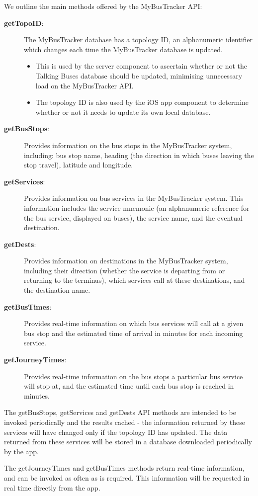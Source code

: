 \documentclass[10pt,twocolumn]{article}
\begin{document}
We outline the main methods offered by the MyBusTracker API:
\begin{description}
\item[\textbf{getTopoID}:] The MyBusTracker database has a topology ID, an alphanumeric identifier which changes each time the MyBusTracker database is updated.
\begin{itemize}
\item  This is used by the server component to ascertain whether or not the Talking Buses database should be updated, minimising unnecessary load on the MyBusTracker API.
\item The topology ID is also used by the iOS app component to determine whether or not it needs to update its own local database.
\end{itemize}
\item[\textbf{getBusStops}:] Provides information on the bus stops in the MyBusTracker system, including: bus stop name, heading (the direction in which buses leaving the stop travel), latitude and longitude.
\item[\textbf{getServices}:]  Provides information on bus services in the MyBusTracker system. This information includes the service mnemonic (an alphanumeric reference for the bus service, displayed on buses), the service name, and the eventual destination.
\item[\textbf{getDests}:] Provides information on destinations in the MyBusTracker system, including their direction (whether the service is departing from or returning to the terminus), which services call at these destinations, and the destination name.
\item[\textbf{getBusTimes}:] Provides real-time information on which bus services will call at a given bus stop and the estimated time of arrival in minutes for each incoming service.
\item[\textbf{getJourneyTimes}:] Provides real-time information on the bus stops a particular bus service will stop at, and the estimated time until each bus stop is reached in minutes.
\end{description}
The getBusStops, getServices and getDests API methods are intended to be invoked periodically and the results cached - the information returned by these services will have changed only if the topology ID has updated. The data returned from these services will be stored in a database downloaded periodically by the app.

The getJourneyTimes and getBusTimes methods return real-time information, and can be invoked as often as is required. This information will be requested in real time directly from the app.
\end{document}
